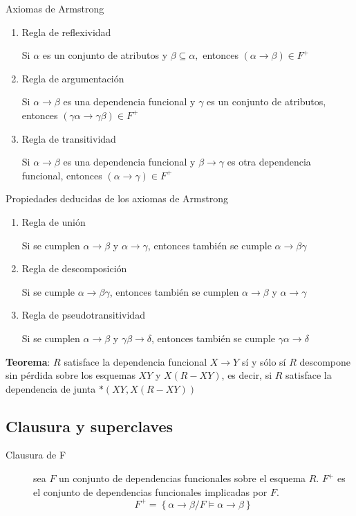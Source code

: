 \documentclass[a4paper, twoside]{article}
\begin{document}
\begin{definicion}[0.9\textwidth]{Axiomas de Armstrong}
	\begin{enumerate}
		\item Regla de reflexividad

		Si $\alpha$ es un conjunto de atributos y $\beta\subseteq\alpha,$ entonces $(\alpha\to\beta)\in F^{+}$

		\item Regla de argumentación

		Si $\alpha \to \beta$ es una dependencia funcional y $\gamma$ es un conjunto de atributos, entonces $(\gamma \alpha \to \gamma \beta) \in F^{+}$

		\item Regla de transitividad

		Si $\alpha \to \beta$ es una dependencia funcional y $\beta \to \gamma$ es otra dependencia funcional, entonces $(\alpha \to \gamma) \in F^{+}$
	\end{enumerate}
\end{definicion}

\begin{propiedades}[0.9\textwidth]{Propiedades deducidas de los axiomas de Armstrong}
	\begin{enumerate}
		\item Regla de unión

		Si se cumplen $\alpha\to\beta$ y $\alpha\to\gamma$, entonces también se cumple $\alpha\to\beta\gamma$

		\item Regla de descomposición

		Si se cumple $\alpha\to\beta\gamma$, entonces también se cumplen $\alpha\to\beta$ y $\alpha\to\gamma$

		\item Regla de pseudotransitividad

		Si se cumplen $\alpha\to\beta$ y $\gamma\beta\to\delta$, entonces también se cumple $\gamma\alpha\to\delta$
	\end{enumerate}
\end{propiedades}

\textbf{Teorema}: $R$ satisface la dependencia funcional $X\to Y$ sí y sólo sí $R$ descompone sin pérdida sobre los esquemas $XY$ y $X(R-XY)$, es decir, si $R$ satisface la dependencia de junta $*\left( XY, X(R-XY) \right)$

\subsection{Clausura y superclaves}
\begin{description}
	\item[Clausura de F] sea $F$ un conjunto de dependencias funcionales sobre el esquema $R$. $F^{+}$ es el conjunto de dependencias funcionales implicadas por $F$.
	\[
		F^{+}=\left\{ \alpha\to\beta/F\vDash\alpha\to\beta\right\} 
	\]
\end{description}
\end{document}
